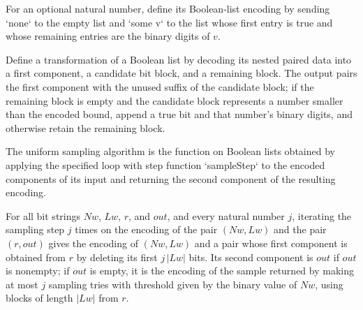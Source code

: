 \begin{definition}
\label{Randomized.encSample}
\leanok
For an optional natural number, define its Boolean-list encoding by sending `none` to
the empty list and `some v` to the list whose first entry is true and whose remaining
entries are the binary digits of $v$.
\end{definition}

\begin{definition}
\label{Randomized.sampleStep}
\leanok
{}
Define a transformation of a Boolean list by decoding its nested paired data into a
first component, a candidate bit block, and a remaining block. The output pairs the
first component with the unused suffix of the candidate block; if the remaining block is
empty and the candidate block represents a number smaller than the encoded bound, append
a true bit and that number's binary digits, and otherwise retain the remaining block.
\end{definition}

\begin{definition}
\label{Randomized.uniformSampleAlg}
\leanok
{}
The uniform sampling algorithm is the function on Boolean lists obtained by applying the
specified loop with step function `sampleStep` to the encoded components of its input
and returning the second component of the resulting encoding.
\end{definition}

\begin{theorem}
\label{Randomized.iterate_sampleStep}
\leanok
{}
For all bit strings $Nw$, $Lw$, $r$, and $out$, and every natural number $j$, iterating
the sampling step $j$ times on the encoding of the pair $(Nw,Lw)$ and the pair $(r,out)$
gives the encoding of $(Nw,Lw)$ and a pair whose first component is obtained from $r$ by
deleting its first $j\,|Lw|$ bits. Its second component is $out$ if $out$ is nonempty;
if $out$ is empty, it is the encoding of the sample returned by making at most $j$
sampling tries with threshold given by the binary value of $Nw$, using blocks of length
$|Lw|$ from $r$.
\end{theorem}

